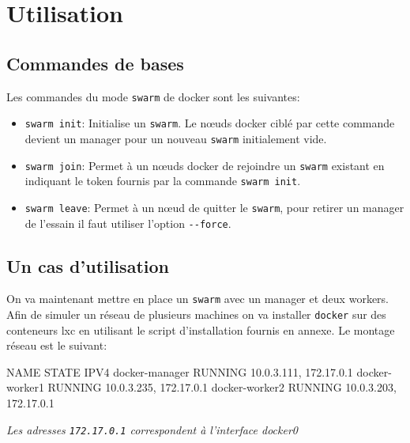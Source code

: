 \chapter{Utilisation}

\section{Commandes de bases}

Les commandes du mode \verb:swarm: de docker sont les suivantes:
\begin{itemize}
	\item \verb:swarm init:: Initialise un \verb:swarm:. Le nœuds docker ciblé par 
        cette commande devient un manager pour un nouveau \verb:swarm: initialement vide.
	\item \verb:swarm join:: Permet à un nœuds docker de rejoindre un \verb:swarm: existant
        en indiquant le token fournis par la commande \verb:swarm init:.
    \item \verb:swarm leave:: Permet à un nœud de quitter le \verb:swarm:, pour retirer un 
        manager de l'essain il faut utiliser l'option \verb:--force:.
\end{itemize}

\section{Un cas d'utilisation}

On va maintenant mettre en place un \verb:swarm: avec un manager et deux workers. Afin de
simuler un réseau de plusieurs machines on va installer \verb:docker: sur des conteneurs
lxc en utilisant le script d'installation fournis en annexe. Le montage réseau est le suivant:
\begin{bash}
NAME           STATE            IPV4        
docker-manager RUNNING 10.0.3.111, 172.17.0.1
docker-worker1 RUNNING 10.0.3.235, 172.17.0.1
docker-worker2 RUNNING 10.0.3.203, 172.17.0.1
\end{bash} 
\begin{center}
    \emph{Les adresses \verb:172.17.0.1: correspondent à l'interface docker0}
\end{center}

